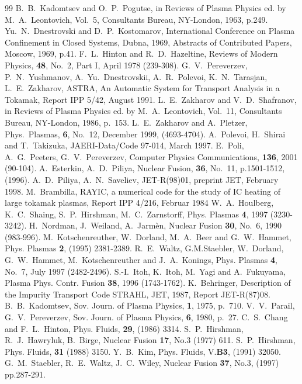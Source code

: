 \begin{thebibliography}{99}
 B.~B.~Kadomtsev and O.~P.~Pogutse, in Reviews of Plasma
Physics ed. by M.~A.~Leontovich, Vol.~5, Consultants Bureau, NY-London,
1963, p.249.
 Yu.~N.~Dnestrovski and D.~P.~Kostomarov, International
Conference on Plasma Confinement in Closed Systems, Dubna, 1969,
Abstracts of Contributed Papers, Moscow, 1969, p.41.
 F.~L.~Hinton and R.~D.~Hazeltine, Reviews of Modern Physics,
{\bf 48}, No.~2, Part I, April 1978 (239-308).
 G.~V.~Pereverzev, P.~N.~Yushmanov, A.~Yu.~Dnestrovskii,
A.~R.~Polevoi, K.~N.~Tarasjan, L.~E.~Zakharov, ASTRA, An Automatic
System for Transport Analysis in a Tokamak, Report IPP 5/42, August 1991.
 L.~E.~Zakharov and V.~D.~Shafranov, in Reviews of Plasma
Physics ed. by M.~A.~Leontovich, Vol.~11, Consultants Bureau, NY-London,
1986, p.~153.
 L.~E.~Zakharov and A.~Pletzer, Phys.~Plasmas, {\bf 6},
No.~12, December 1999, (4693-4704).
 A.~Polevoi, H.~Shirai and T.~Takizuka, JAERI-Data/Code
97-014, March 1997.
 E.~Poli, A.~G.~Peeters, G.~V.~Pereverzev, 
Computer Physics Communications, {\bf 136}, 2001 (90-104).
 A.~Esterkin, A.~D.~Piliya, 
Nuclear Fusion, {\bf 36}, No.~11, p.1501-1512, (1996). 
A.~D.~Piliya, A.~N.~Saveliev, 
JET-R(98)01, preprint JET, February 1998.
 M.~Brambilla, RAYIC, a numerical code for the study of IC
heating of large tokamak plasmas, Report IPP 4/216, Februar 1984
 W.~A.~Houlberg, K.~C.~Shaing, S.~P.~Hirshman,
M.~C.~Zarnstorff, Phys. Plasmas {\bf 4}, 1997 (3230-3242). 
 H.~Nordman, J.~Weiland, A.~Jarm\`en, Nuclear Fusion
{\bf 30}, No.~6, 1990 (983-996). 
 M.~Kotschenreuther, W.~Dorland, M.~A.~Beer and
G.~W.~Hammet, Phys. Plasmas {\bf 2}, (1995) 2381-2389.
 R.~E.~Waltz, G.M.Staebler, W.~Dorland, G.~W.~Hammet,
M.~Kotschenreuther and J.~A.~Konings, Phys. Plasmas {\bf 4}, No.~7, July
1997 (2482-2496). 
 S.-I.~Itoh, K.~Itoh, M.~Yagi and A.~Fukuyama, Plasma
Phys. Contr. Fusion {\bf 38}, 1996 (1743-1762). 
 K.~Behringer, Description of the Impurity Transport Code STRAHL, JET, 1987, Report JET-R(87)08.
 B.~B.~Kadomtsev, Sov. Journ. of Plasma Physics, {\bf 1},
1975, p.~710.
 V.~V.~Parail, G.~V.~Pereverzev, Sov. Journ. of Plasma
Physics, {\bf 6}, 1980, p.~27.
 C.~S.~Chang and F.~L.~Hinton, Phys. Fluids, {\bf 29}, (1986)
3314.  
 S.~P.~Hirshman, R.~J.~Hawryluk, B.~Birge, Nuclear Fusion
{\bf 17}, No.3 (1977) 611. 
 S.~P.~Hirshman, Phys. Fluids, {\bf 31} (1988) 3150.
 Y.~B.~Kim,  Phys. Fluids, V.{\bf B3}, (1991) 32050.  
 G.~M.~Staebler, R.~E.~Waltz, J.~C.~Wiley, Nuclear Fusion 
{\bf 37}, No.3, (1997) pp.287-291.
\end{thebibliography}
